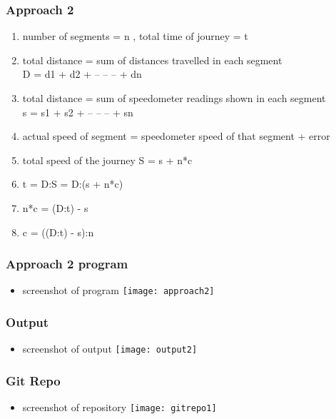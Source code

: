 \documentclass{beamer}
\begin{document}
    \begin{frame}
            \frametitle{Approach 2}
	    \begin{enumerate}
                    \item number of segments = n , total time of journey = t
	 	    \item total distance = sum of distances travelled in each segment\\D = d1 + d2 + -- -- -- + dn
		    \item total distance = sum of speedometer readings shown in each segment\\s = s1 + s2 + -- -- -- + sn
		    \item actual speed of segment = speedometer speed of that segment + error
	 	    \item total speed of the journey S = s + n*c
		    \item t = D:S = D:(s + n*c)
		    \item n*c = (D:t) - s
		    \item c = ((D:t) - s):n
            \end{enumerate}
    \end{frame}


    \begin{frame}
	    \frametitle{Approach 2 program}
	    \begin{itemize}
		    \item screenshot of program
			    \texttt{[image: approach2]}
    	    \end{itemize}
    \end{frame}

    \begin{frame}
	    \frametitle{Output}
	    \begin{itemize}
		    \item screenshot of output
			    \texttt{[image: output2]}
	    \end{itemize}
    \end{frame}

    \begin{frame}
	    \frametitle{Git Repo}
	    \begin{itemize}
		\item screenshot of repository
			\texttt{[image: gitrepo1]}
	    \end{itemize}
    \end{frame}
\end{document}
